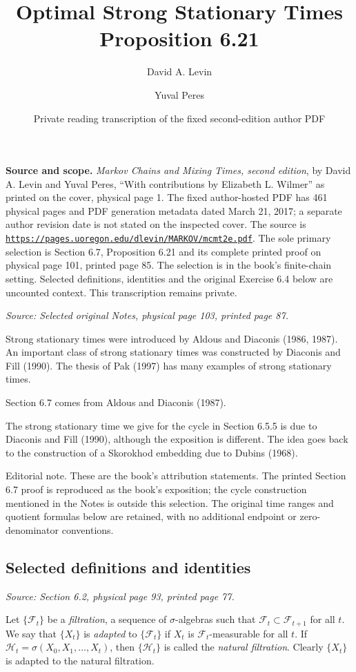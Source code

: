 \documentclass[11pt]{article}
\title{Optimal Strong Stationary Times\\Proposition 6.21}
\author{David A. Levin \and Yuval Peres}
\date{Private reading transcription of the fixed second-edition author PDF}
\newcommand{\Ft}{\mathcal{F}_t}
\newcommand{\sourceloc}[1]{\par\smallskip\noindent\textit{Source: #1.}\par\nopagebreak[4]\smallskip}
\newcommand{\editorial}[1]{\par\smallskip\noindent\textsf{Editorial note.} #1\par\smallskip}
\begin{document}
\maketitle

\noindent\textbf{Source and scope.}
\emph{Markov Chains and Mixing Times, second edition}, by David A. Levin
and Yuval Peres, ``With contributions by Elizabeth L. Wilmer'' as printed
on the cover, physical page 1. The fixed author-hosted PDF has 461 physical
pages and PDF generation metadata dated March 21, 2017; a separate author
revision date is not stated on the inspected cover.
The source is \href{https://pages.uoregon.edu/dlevin/MARKOV/mcmt2e.pdf}{\nolinkurl{https://pages.uoregon.edu/dlevin/MARKOV/mcmt2e.pdf}}.
The sole primary selection is Section 6.7, Proposition 6.21 and its complete
printed proof on physical page 101, printed page 85. The selection is in
the book's finite-chain setting. Selected definitions, identities and the
original Exercise 6.4 below are uncounted context. This transcription
remains private.

\sourceloc{Selected original Notes, physical page 103, printed page 87}
Strong stationary times were introduced by Aldous and Diaconis (1986,
1987). An important class of strong stationary times was constructed by
Diaconis and Fill (1990). The thesis of Pak (1997) has many examples of
strong stationary times.

Section 6.7 comes from Aldous and Diaconis (1987).

The strong stationary time we give for the cycle in Section 6.5.5 is due
to Diaconis and Fill (1990), although the exposition is different. The idea
goes back to the construction of a Skorokhod embedding due to Dubins (1968).

\editorial{These are the book's attribution statements. The printed
Section 6.7 proof is reproduced as the book's exposition; the cycle
construction mentioned in the Notes is outside this selection. The
original time ranges and quotient formulas below are retained, with no
additional endpoint or zero-denominator conventions.}

\subsection*{Selected definitions and identities}
\sourceloc{Section 6.2, physical page 93, printed page 77}
Let $\{\Ft\}$ be a \emph{filtration}, a sequence of $\sigma$-algebras such
that $\Ft\subset\mathcal{F}_{t+1}$ for all $t$. We say that $\{X_t\}$ is
\emph{adapted} to $\{\Ft\}$ if $X_t$ is $\Ft$-measurable for all $t$.
If $\mathcal{H}_t=\sigma(X_0,X_1,\ldots,X_t)$, then
$\{\mathcal{H}_t\}$ is called the \emph{natural filtration}. Clearly
$\{X_t\}$ is adapted to the natural filtration.
\end{document}
